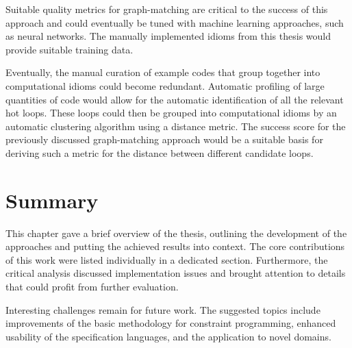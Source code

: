     Suitable quality metrics for graph-matching are critical to the success
    of this approach and could eventually be tuned with machine learning
    approaches, such as neural networks.
    The manually implemented idioms from this thesis would provide suitable
    training data.

    Eventually, the manual curation of example codes that group together into
    computational idioms could become redundant.
    Automatic profiling of large quantities of code would allow for the
    automatic identification of all the relevant hot loops.
    These loops could then be grouped into computational idioms by an
    automatic clustering algorithm using a distance metric.
    The success score for the previously discussed graph-matching approach
    would be a suitable basis for deriving such a metric for the distance
    between different candidate loops.

\section{Summary}

    This chapter gave a brief overview of the thesis, outlining the development
    of the approaches and putting the achieved results into context.
    The core contributions of this work were listed individually in a dedicated
    section.
    Furthermore, the critical analysis discussed implementation issues and
    brought attention to details that could profit from further evaluation.

    Interesting challenges remain for future work.
    The suggested topics include improvements of the basic methodology for
    constraint programming, enhanced usability of the specification languages,
    and the application to novel domains.
